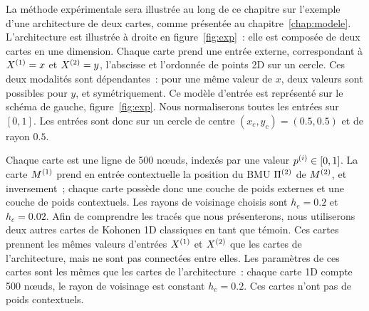 \documentclass[../main]{subfiles}
\begin{document}
La méthode expérimentale sera illustrée au long de ce chapitre sur l'exemple d'une architecture de deux cartes, comme présentée au chapitre~\ref{chap:modele}.
L'architecture est illustrée à droite en figure~\ref{fig:exp}~: elle est composée de deux cartes en une dimension. Chaque carte prend une entrée externe, correspondant à $X^{({1})}=x$ et $X^{({2})}=y$, l'abscisse et l'ordonnée de points 2D sur un cercle. 
Ces deux modalités sont dépendantes~: pour une même valeur de $x$, deux valeurs sont possibles pour $y$, et symétriquement. Ce modèle d'entrée est représenté sur le schéma de gauche, figure~\ref{fig:exp}.
Nous normaliserons toutes les entrées sur $[0,1]$. Les entrées sont donc sur un cercle de centre $(x_c,y_c) = (0.5,0.5)$ et de rayon $0.5$.

Chaque carte est une ligne de 500 n\oe{}uds, indexés par une valeur $p^{({i})} \in [0,1]$.
La carte $M^{({1})}$ prend en entrée contextuelle la position du BMU $\Pi^{({2})}$ de $M^{({2})}$, et inversement~; chaque carte possède donc une couche de poids externes et une couche de poids contextuels. Les rayons de voisinage choisis sont $h_e = 0.2$ et $h_c = 0.02$.
Afin de comprendre les tracés que nous présenterons, nous utiliserons deux autres cartes de Kohonen 1D classiques en tant que témoin.
Ces cartes prennent les mêmes valeurs d'entrées $X^{({1})}$ et $X^{({2})}$ que les cartes de l'architecture, mais ne sont pas connectées entre elles. 
Les paramètres de ces cartes sont les mêmes que les cartes de l'architecture~: chaque carte 1D compte 500 n\oe{}uds, le rayon de voisinage est constant $h_e = 0.2$. Ces cartes n'ont pas de poids contextuels.
\end{document}
